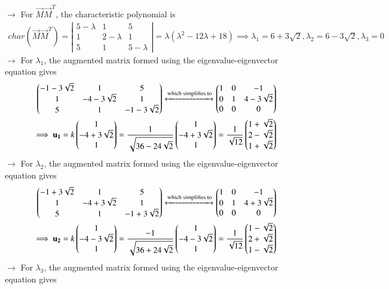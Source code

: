 \documentclass[journal]{IEEEtran}
\begin{document}
$\rightarrow$ For $\vec{M}\vec{M}^T$, the characteristic polynomial is
\begin{align}
    char(\vec{M}\vec{M}^T) = \left|\begin{array}{ccc}5-\lambda&1&5\\1&2-\lambda&1\\5&1&5-\lambda\end{array}\right| = \lambda(\lambda^2 - 12\lambda + 18)
    \implies \lambda_1 = 6 + 3\sqrt{2}, \lambda_2 = 6 - 3\sqrt{2}, \lambda_3 = 0
\end{align}
$\rightarrow$ For $\lambda_1$, the augmented matrix formed using the eigenvalue-eigenvector equation gives
\begin{align}
    \begin{pmatrix}-1-3\sqrt{2}&1&5\\1&-4-3\sqrt{2}&1\\5&1&-1-3\sqrt{2}\end{pmatrix}\xleftrightarrow{\text{which simplifies to}}\begin{pmatrix}1&0&-1\\0&1&4-3\sqrt{2}\\0&0&0\end{pmatrix} \\
    \implies \mathbf{u_1} = k\begin{pmatrix}1\\-4+3\sqrt{2}\\1\end{pmatrix} = \frac{1}{\sqrt{36-24\sqrt{2}}}\begin{pmatrix}1\\-4+3\sqrt{2}\\1\end{pmatrix} = \frac{1}{\sqrt{12}}\begin{pmatrix}1+\sqrt{2}\\2-\sqrt{2}\\1+\sqrt{2}\end{pmatrix}
\end{align}
$\rightarrow$ For $\lambda_2$, the augmented matrix formed using the eigenvalue-eigenvector equation gives
\begin{align}
    \begin{pmatrix}-1+3\sqrt{2}&1&5\\1&-4+3\sqrt{2}&1\\5&1&-1+3\sqrt{2}\end{pmatrix}\xleftrightarrow{\text{which simplifies to}}\begin{pmatrix}1&0&-1\\0&1&4+3\sqrt{2}\\0&0&0\end{pmatrix} \\
    \implies \mathbf{u_2} = k\begin{pmatrix}1\\-4-3\sqrt{2}\\1\end{pmatrix} = \frac{-1}{\sqrt{36+24\sqrt{2}}}\begin{pmatrix}1\\-4-3\sqrt{2}\\1\end{pmatrix} = \frac{1}{\sqrt{12}}\begin{pmatrix}1-\sqrt{2}\\2+\sqrt{2}\\1-\sqrt{2}\end{pmatrix}
\end{align}
$\rightarrow$ For $\lambda_3$, the augmented matrix formed using the eigenvalue-eigenvector equation gives
\end{document}
